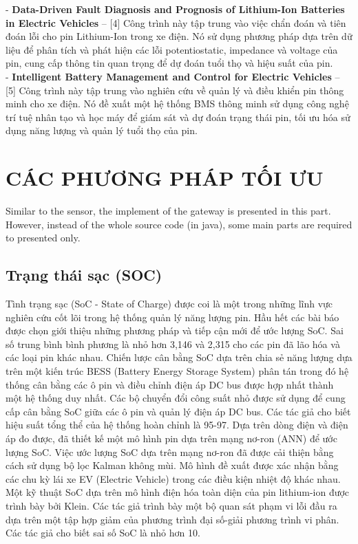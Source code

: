 \documentclass[a4paper,11pt]{article}
\theoremstyle{mytheor}
\begin{document}
- \textbf{Data-Driven Fault Diagnosis and Prognosis of Lithium-Ion Batteries in Electric Vehicles} – [4] Công trình này tập trung vào việc chẩn đoán và tiên đoán lỗi cho pin Lithium-Ion trong xe điện. Nó sử dụng phương pháp dựa trên dữ liệu để phân tích và phát hiện các lỗi potentiostatic, impedance và voltage của pin, cung cấp thông tin quan trọng để dự đoán tuổi thọ và hiệu suất của pin.\\

- \textbf{Intelligent Battery Management and Control for Electric Vehicles} – [5] Công trình này tập trung vào nghiên cứu về quản lý và điều khiển pin thông minh cho xe điện. Nó đề xuất một hệ thống BMS thông minh sử dụng công nghệ trí tuệ nhân tạo và học máy để giám sát và dự đoán trạng thái pin, tối ưu hóa sử dụng năng lượng và quản lý tuổi thọ của pin.\\


\section{CÁC PHƯƠNG PHÁP TỐI ƯU }
Similar to the sensor, the implement of the gateway is presented in this part. However, instead of the whole source code (in java), some main parts are required to presented only.


\subsection{Trạng thái sạc (SOC)}
Tình trạng sạc (SoC - State of Charge) được coi là một trong những lĩnh vực nghiên cứu cốt lõi trong hệ thống quản lý năng lượng pin. Hầu hết các bài báo được chọn giới thiệu những phương pháp và tiếp cận mới để ước lượng SoC. Sai số trung bình bình phương là nhỏ hơn 3,146 và 2,315 cho các pin đã lão hóa và các loại pin khác nhau. Chiến lược cân bằng SoC dựa trên chia sẻ năng lượng dựa trên một kiến trúc BESS (Battery Energy Storage System) phân tán trong đó hệ thống cân bằng các ô pin và điều chỉnh điện áp DC bus được hợp nhất thành một hệ thống duy nhất. Các bộ chuyển đổi công suất nhỏ được sử dụng để cung cấp cân bằng SoC giữa các ô pin và quản lý điện áp DC bus. Các tác giả cho biết hiệu suất tổng thể của hệ thống hoàn chỉnh là 95-97. Dựa trên dòng điện và điện áp đo được, đã thiết kế một mô hình pin dựa trên mạng nơ-ron (ANN) để ước lượng SoC. Việc ước lượng SoC dựa trên mạng nơ-ron đã được cải thiện bằng cách sử dụng bộ lọc Kalman không mùi. Mô hình đề xuất được xác nhận bằng các chu kỳ lái xe EV (Electric Vehicle) trong các điều kiện nhiệt độ khác nhau. Một kỹ thuật SoC dựa trên mô hình điện hóa toàn diện của pin lithium-ion được trình bày bởi Klein. Các tác giả trình bày một bộ quan sát phạm vi lỗi đầu ra dựa trên một tập hợp giảm của phương trình đại số-giải phương trình vi phân. Các tác giả cho biết sai số SoC là nhỏ hơn 10.\\
\end{document}
